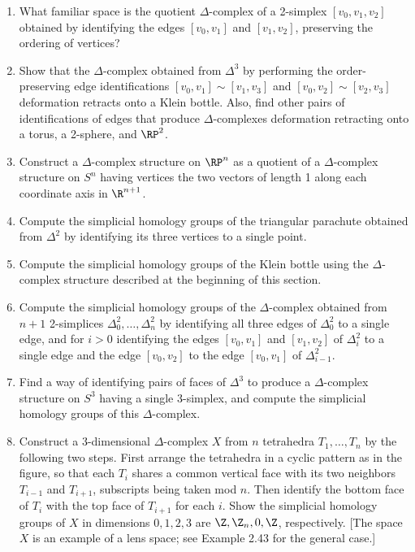 \begin{enumerate}

\item What familiar space is the quotient $\Delta$-complex of a 2-simplex $[v_0, v_1, v_2]$ obtained
by identifying the edges $[v_0, v_1]$ and $[v_1, v_2]$, preserving the ordering of vertices?

\item Show that the $\Delta$-complex obtained from $\Delta^3$ by performing the order-preserving
edge identifications $[v_0, v_1] \sim [v_1, v_3]$ and $[v_0, v_2] \sim [v_2, v_3]$ deformation retracts
onto a Klein bottle. Also, find other pairs of identifications of edges that produce
$\Delta$-complexes deformation retracting onto a torus, a 2-sphere, and $\RP^2$.

\item Construct a $\Delta$-complex structure on $\RP^n$ as a quotient of a $\Delta$-complex structure
on $S^n$ having vertices the two vectors of length 1 along each coordinate axis in $\R^{n+1}$.

\item Compute the simplicial homology groups of the triangular parachute obtained from
$\Delta^2$ by identifying its three vertices to a single point.

\item Compute the simplicial homology groups of the Klein bottle using the $\Delta$-complex
structure described at the beginning of this section.

\item Compute the simplicial homology groups of the $\Delta$-complex obtained from $n + 1$
2-simplices $\Delta_0^2, \ldots, \Delta_n^2$ by identifying all three edges of $\Delta_0^2$ to a single edge, and for
$i > 0$ identifying the edges $[v_0, v_1]$ and $[v_1, v_2]$ of $\Delta_i^2$ to a single edge and the edge
$[v_0, v_2]$ to the edge $[v_0, v_1]$ of $\Delta_{i-1}^2$.

\item Find a way of identifying pairs of faces of $\Delta^3$ to produce a $\Delta$-complex structure
on $S^3$ having a single 3-simplex, and compute the simplicial homology groups of this
$\Delta$-complex.

\item Construct a 3-dimensional $\Delta$-complex $X$ from $n$ tetrahedra $T_1, \ldots, T_n$ by the following two steps. First arrange the
tetrahedra in a cyclic pattern as in the figure, so that each $T_i$
shares a common vertical face with its two neighbors $T_{i-1}$
and $T_{i+1}$, subscripts being taken mod $n$. Then identify the
bottom face of $T_i$ with the top face of $T_{i+1}$ for each $i$. Show the simplicial homology
groups of $X$ in dimensions $0, 1, 2, 3$ are $\Z, \Z_n, 0, \Z$, respectively. [The space $X$ is
an example of a lens space; see Example 2.43 for the general case.]


\end{enumerate}
